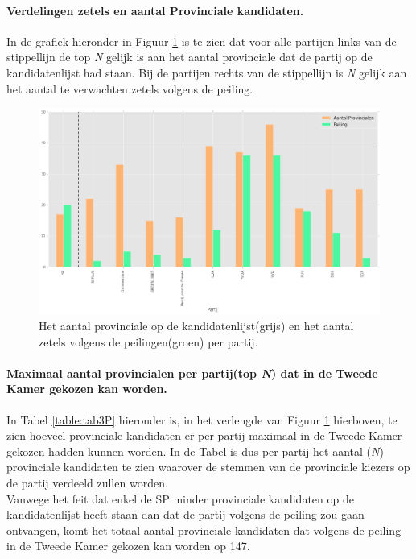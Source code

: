  
\paragraph{Verdelingen zetels en aantal Provinciale kandidaten.}
In de grafiek hieronder in Figuur \ref{fig:zetelsP} is te zien dat voor alle partijen links van de stippellijn de top \textit{N} gelijk is aan het aantal provinciale dat de partij op de kandidatenlijst had staan. Bij de partijen rechts van de stippellijn is \textit{N} gelijk aan het aantal te verwachten zetels volgens de peiling. 

 
\begin{figure}[H]

	\includegraphics[width=\linewidth]	{Aantal_provincialen_aantal_zetels.png}

			\caption{Het aantal provinciale op de kandidatenlijst(grijs) en het aantal zetels volgens de peilingen(groen) per partij.}

\label{fig:zetelsP}
\end{figure}

\paragraph{Maximaal aantal provincialen per partij(top \textit{N}) dat in de Tweede Kamer gekozen kan worden.}
In Tabel \ref{table:tab3P} hieronder is, in het verlengde van Figuur \ref{fig:zetelsP}  hierboven, te zien hoeveel provinciale kandidaten er per partij maximaal in de Tweede Kamer gekozen hadden kunnen worden. In de Tabel is dus per partij het aantal (\textit{N}) provinciale kandidaten te zien waarover de stemmen van de provinciale kiezers op de partij verdeeld zullen worden.  
\\
\indent Vanwege het feit dat enkel de SP minder provinciale kandidaten op de kandidatenlijst heeft staan dan dat de partij volgens de peiling zou gaan ontvangen, komt het totaal aantal provinciale kandidaten dat volgens de peiling in de Tweede Kamer gekozen kan worden op 147.




